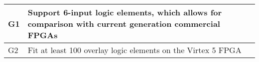 \begin{tabular}{|p{1cm}|p{15cm}|}
\hline
G1 & Support 6-input logic elements, which allows for comparison with current generation commercial FPGAs\\ \hline
G2 & Fit at least 100 overlay logic elements on the Virtex 5 FPGA \\ \hline
\end{tabular}


